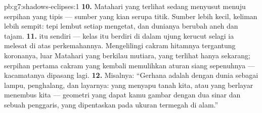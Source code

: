 \begin{solution}{pb:g7:shadows-eclipses:1}
\textbf{10.} Matahari yang terlihat sedang menyusut menuju serpihan
yang tipis --- sumber yang kian serupa titik. Sumber lebih kecil,
keliman  lebih sempit: tepi lembut setiap 
mengetat, dan dunianya berubah aneh dan tajam.
\textbf{11.}   itu sendiri --- kelas itu berdiri di dalam
ujung kerucut  selagi ia melesat di atas perkemahannya.
Mengelilingi cakram hitamnya tergantung koronanya,  luar
Matahari yang berkilau mutiara, yang terlihat hanya sekarang;
serpihan pertama cakram yang kembali memulihkan aturan  siang
sepenuhnya --- kacamatanya dipasang lagi.
\textbf{12.} Misalnya: ``Gerhana adalah  dengan dunia
sebagai lampu, penghalang, dan layarnya:   yang menyapu
tanah kita, atau  yang berlayar menembus  kita --- geometri
yang dapat kamu gambar dengan dua sinar dan sebuah penggaris, yang
dipentaskan pada ukuran termegah di alam.''
\end{solution}
